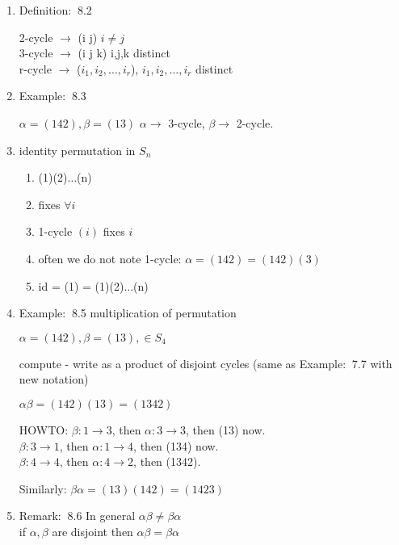 \documentclass[12pt]{article}
\newcommand{\defi}{{\color{blue} Definition: $\ $}}
\newcommand{\exe}{{\color{green} Example: $\ $}}
\newcommand{\rem}{{\color{blue} Remark: $\ $}}
\begin{document}
\begin{enumerate}
\begin{enumerate}
        \item \defi 8.2 
    
        2-cycle $\rightarrow$ (i j) $i\ne j$ \\
        3-cycle $\rightarrow$ (i j k) i,j,k distinct \\
        r-cycle $\rightarrow$ ($i_1, i_2, \dots, i_r$),  $i_1, i_2, \dots, i_r$ distinct

        \item \exe 8.3
    
        $\alpha = (142), \beta = (13)$
        $\alpha \rightarrow$ 3-cycle, $\beta \rightarrow$ 2-cycle.

        \item identity permutation in $S_n$
    
        \begin{enumerate}
            \item (1)(2)$\dots$(n)
            
            \item fixes $\forall i$
            
            \item 1-cycle $(i)$ fixes $i$
            
            \item often we do not note 1-cycle: $\alpha = (142) = (142)(3)$
            
            \item id = (1) = (1)(2)$\dots$(n)
        \end{enumerate}

        \item \exe 8.5 multiplication of permutation
        
        $\alpha = (142), \beta = (13), \in S_4$

        compute - write as a product of disjoint cycles (same as \exe 7.7 with new notation)

        $\alpha\beta = (142)(13) = (1342)$

        HOWTO: $\beta: 1 \rightarrow 3$, then $\alpha: 3 \rightarrow 3$, then (13) now.\\
        $\beta: 3 \rightarrow 1$, then $\alpha: 1 \rightarrow 4$, then (134) now.\\
        $\beta: 4 \rightarrow 4$, then $\alpha: 4 \rightarrow 2$, then (1342).

        Similarly: $\beta\alpha = (13)(142) = (1423)$

        \item \rem 8.6
        In general $\alpha\beta \ne \beta\alpha$\\
        if $\alpha, \beta$ are disjoint then $\alpha\beta  = \beta\alpha$
        


\end{enumerate}
\end{enumerate}
\end{document}
